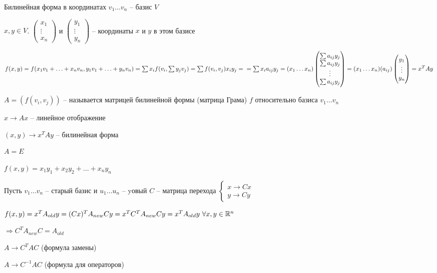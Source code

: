 \documentclass[12pt]{article}
\begin{document}
\begin{Example}{Билинейная форма в координатах}
    $v_1 \ldots v_n$ -- базис $V$

    $x, y \in V$. $\begin{pmatrix}
        x_1 \\
        \vdots \\
        x_n
    \end{pmatrix}$ и $\begin{pmatrix}
        y_1 \\
        \vdots \\
        y_n
    \end{pmatrix}$ -- координаты $x$ и $y$ в этом базисе

    $f(x, y) = f(x_1v_1 + \ldots + x_nv_n, y_1v_1 + \ldots + y_nv_n) = \sum x_if(v_i, \sum y_jv_j) = \sum f(v_i, v_j)x_iy_j = \\
    = \sum x_ia_{ij}y_j = (x_1 \ldots x_n) \begin{pmatrix}
        \sum a_{ij}y_j \\
        \sum a_{ij}y_j \\
        \vdots \\
        \sum a_{ij}y_j
        \end{pmatrix} = (x_1 \ldots x_n)(a_{ij})\begin{pmatrix}
        y_1 \\
        \vdots \\
        y_n
        \end{pmatrix} = x^TAy$
\end{Example}

\begin{defin}{}
    $A = (f(v_i, v_j))$ -- называется матрицей билинейной формы (матрица Грама) $f$ относительно базиса $v_1 \ldots v_n$

    $x \to Ax$ -- линейное отображение

    $(x, y) \to x^TAy$ -- билинейная форма
\end{defin}

\begin{Example}{}
    $A = E$

    $f(x, y) = x_1y_1 + x_2y_2 + \ldots + x_ny_n$

    Пусть $v_1 \ldots v_n$ -- старый базис и $u_1 \ldots u_n$ -- yовый $C$ -- матрица перехода $\begin{cases}
        x \to Cx \\
        y \to Cy
    \end{cases}$

    $f(x, y) = x^TA_{old}y = (Cx)^TA_{new}Cy = x^TC^TA_{new}Cy = x^TA_{old}y\ \forall x, y \in \mathbb R^n$

    $\Rightarrow C^TA_{new}C = A_{old}$

    $A \to C^TAC$ (формула замены)

    $A \to C^{-1}AC$ (формула для операторов)
\end{Example}
\end{document}
